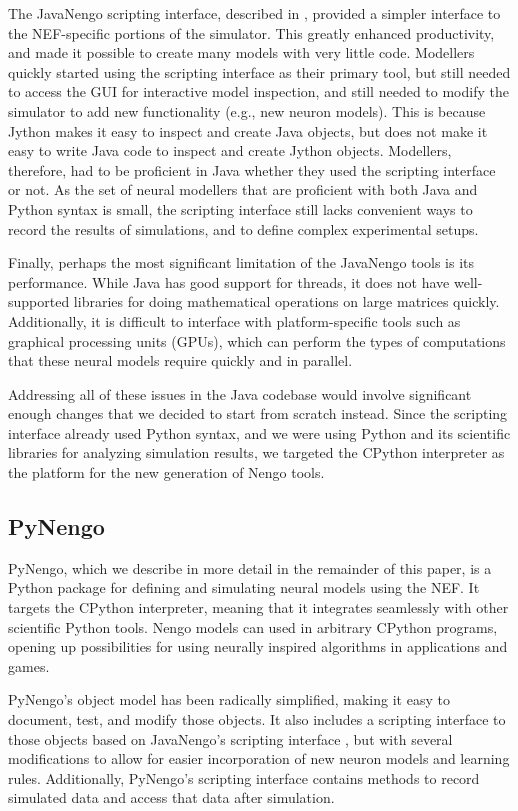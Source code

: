 \documentclass{frontiersSCNS}
\begin{document}
The JavaNengo scripting interface,
described in \cite{TODO},
provided a simpler interface
to the NEF-specific portions of the simulator.
This greatly enhanced productivity,
and made it possible
to create many models with very little code.
Modellers quickly started using
the scripting interface
as their primary tool,
but still needed to access the GUI
for interactive model inspection,
and still needed to modify the simulator
to add new functionality
(e.g., new neuron models).
This is because Jython makes it easy
to inspect and create Java objects,
but does not make it easy to
write Java code to
inspect and create Jython objects.
Modellers, therefore, had to be
proficient in Java whether
they used the scripting interface or not.
As the set of neural modellers
that are proficient with both Java and Python
syntax is small,
the scripting interface still lacks
convenient ways to record the results of simulations,
and to define complex experimental setups.

Finally, perhaps the most significant limitation
of the JavaNengo tools is its performance.
While Java has good support for threads,
it does not have well-supported libraries
for doing mathematical operations on large matrices quickly.
Additionally, it is difficult to interface with
platform-specific tools such as
graphical processing units (GPUs),
which can perform the types of computations
that these neural models require quickly and in parallel.

Addressing all of these issues
in the Java codebase would involve
significant enough changes
that we decided to start from scratch instead.
Since the scripting interface
already used Python syntax,
and we were using Python
and its scientific libraries
for analyzing simulation results,
we targeted the CPython interpreter
as the platform for the new generation of Nengo tools.

\subsection{PyNengo}

PyNengo, which we describe in more detail
in the remainder of this paper,
is a Python package for
defining and simulating
neural models using the NEF.
It targets the CPython interpreter,
meaning that it integrates seamlessly
with other scientific Python tools.
Nengo models can used
in arbitrary CPython programs,
opening up possibilities
for using neurally inspired algorithms
in applications and games.

PyNengo's object model has been radically simplified,
making it easy to
document, test, and modify those objects.
It also includes a scripting interface to those objects
based on JavaNengo's scripting interface \cite{TODO},
but with several modifications
to allow for easier incorporation
of new neuron models and learning rules.
Additionally, PyNengo's scripting interface
contains methods to record simulated data
and access that data after simulation.
\end{document}
